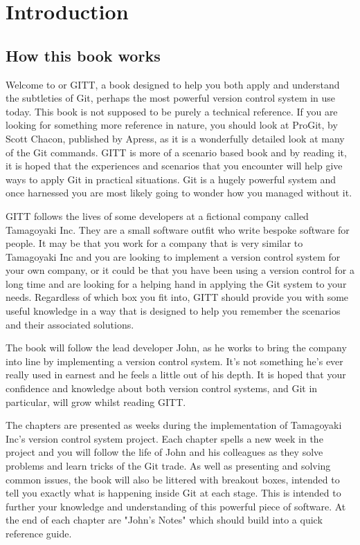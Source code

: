 \cleardoublepage
\chapter{Introduction}
\section{How this book works}

Welcome to \textit{\thetitle} or GITT, a book designed to help you both apply and understand the subtleties of Git, perhaps the most powerful version control system in use today.
This book is not supposed to be purely a technical reference.
If you are looking for something more reference in nature, you should look at ProGit, by Scott Chacon, published by Apress, as it is a wonderfully detailed look at many of the Git commands.
GITT is more of a scenario based book and by reading it, it is hoped that the experiences and scenarios that you encounter will help give ways to apply Git in practical situations.
Git is a hugely powerful system and once harnessed you are most likely going to wonder how you managed without it.

GITT follows the lives of some developers at a fictional company called Tamagoyaki Inc.
They are a small software outfit who write bespoke software for people.
It may be that you work for a company that is very similar to Tamagoyaki Inc and you are looking to implement a version control system for your own company, or it could be that you have been using a version control for a long time and are looking for a helping hand in applying the Git system to your needs.
Regardless of which box you fit into, GITT should provide you with some useful knowledge in a way that is designed to help you remember the scenarios and their associated solutions.

The book will follow the lead developer John, as he works to bring the company into line by implementing a version control system.
It's not something he's ever really used in earnest and he feels a little out of his depth.
It is hoped that your confidence and knowledge about both version control systems, and Git in particular, will grow whilst reading GITT.

The chapters are presented as weeks during the implementation of Tamagoyaki Inc's version control system project.
Each chapter spells a new week in the project and you will follow the life of John and his colleagues as they solve problems and learn tricks of the Git trade.
As well as presenting and solving common issues, the book will also be littered with breakout boxes, intended to tell you exactly what is happening inside Git at each stage.
This is intended to further your knowledge and understanding of this powerful piece of software.
At the end of each chapter are "John's Notes" which should build into a quick reference guide.

